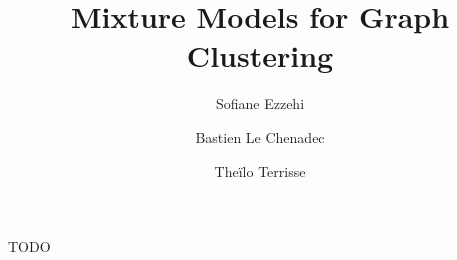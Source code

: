 \documentclass[switch, 12pt]{article}
\title{Mixture Models for Graph Clustering}
\author[1]{Sofiane Ezzehi}
\author[1]{Bastien Le Chenadec}
\author[1]{Theïlo Terrisse}
\affil[1]{École des Ponts ParisTech}
\begin{document}




\maketitle

\begin{contribstatement}
    TODO
\end{contribstatement}
\vspace{0.35cm}
\end{document}
